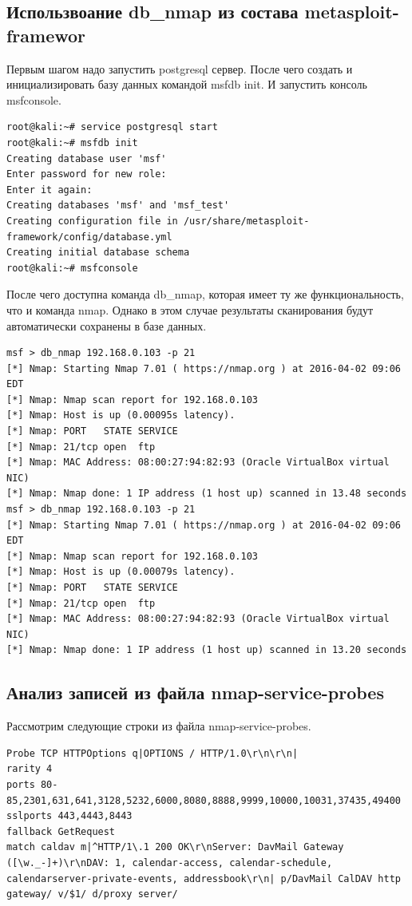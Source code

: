\documentclass[10pt,a4paper]{report}
\begin{document}
\subsection{Использвоание db\_nmap из состава metasploit-framewor}
Первым шагом надо запустить postgresql сервер.  После чего создать и инициализировать базу данных командой msfdb init. И запустить консоль  msfconsole.
\begin{verbatim}
root@kali:~# service postgresql start
root@kali:~# msfdb init
Creating database user 'msf'
Enter password for new role: 
Enter it again: 
Creating databases 'msf' and 'msf_test'
Creating configuration file in /usr/share/metasploit-framework/config/database.yml
Creating initial database schema
root@kali:~# msfconsole
\end{verbatim}
После чего доступна команда db\_nmap, которая имеет ту же функциональность, что и команда nmap. Однако в этом случае результаты сканирования будут автоматически сохранены в базе данных. 
\begin{verbatim}
msf > db_nmap 192.168.0.103 -p 21
[*] Nmap: Starting Nmap 7.01 ( https://nmap.org ) at 2016-04-02 09:06 EDT
[*] Nmap: Nmap scan report for 192.168.0.103
[*] Nmap: Host is up (0.00095s latency).
[*] Nmap: PORT   STATE SERVICE
[*] Nmap: 21/tcp open  ftp
[*] Nmap: MAC Address: 08:00:27:94:82:93 (Oracle VirtualBox virtual NIC)
[*] Nmap: Nmap done: 1 IP address (1 host up) scanned in 13.48 seconds
msf > db_nmap 192.168.0.103 -p 21
[*] Nmap: Starting Nmap 7.01 ( https://nmap.org ) at 2016-04-02 09:06 EDT
[*] Nmap: Nmap scan report for 192.168.0.103
[*] Nmap: Host is up (0.00079s latency).
[*] Nmap: PORT   STATE SERVICE
[*] Nmap: 21/tcp open  ftp
[*] Nmap: MAC Address: 08:00:27:94:82:93 (Oracle VirtualBox virtual NIC)
[*] Nmap: Nmap done: 1 IP address (1 host up) scanned in 13.20 seconds
\end{verbatim}
\subsection{Анализ записей из файла nmap-service-probes}
Рассмотрим следующие строки из файла nmap-service-probes.
\begin{verbatim}
Probe TCP HTTPOptions q|OPTIONS / HTTP/1.0\r\n\r\n|
rarity 4
ports 80-85,2301,631,641,3128,5232,6000,8080,8888,9999,10000,10031,37435,49400
sslports 443,4443,8443
fallback GetRequest
match caldav m|^HTTP/1\.1 200 OK\r\nServer: DavMail Gateway ([\w._-]+)\r\nDAV: 1, calendar-access, calendar-schedule, calendarserver-private-events, addressbook\r\n| p/DavMail CalDAV http gateway/ v/$1/ d/proxy server/
\end{verbatim}
\end{document}
